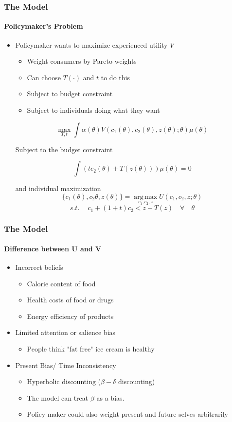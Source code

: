 \documentclass{beamer}
\DeclareMathOperator*{\argmax}{arg\,max}
\begin{document}
\begin{frame}
\frametitle{The Model}
\framesubtitle{Policymaker's Problem}

\begin{itemize}
	\item Policymaker wants to maximize experienced utility $V$
	\begin{itemize}
		\item Weight consumers by Pareto weights 
		\item Can choose $T(\cdot)$ and $t$ to do this
		\item Subject to budget constraint
		\item Subject to individuals doing what they want
		
	\end{itemize}

$$  \max\limits_{T,t} \int \alpha(\theta) V(c_1(\theta), c_2(\theta), z(\theta); \theta)\mu(\theta)
$$

Subject to the budget constraint 

$$ \int (tc_2(\theta) + T(z(\theta)))\mu(\theta) = 0$$

and individual maximization 
$$ \{c_1(\theta),c_2\theta, z(\theta) \} = \argmax \limits_{c_1, c_2, z} U(c_1, c_2, z; \theta) $$
$$ s.t. \quad \ c_1 + (1+t)c_2 < z-T(z)\quad \forall\quad \theta$$
 
	
\end{itemize}
	
\end{frame}


\begin{frame}
\frametitle{The Model}
\framesubtitle{Difference between U and V}

\begin{itemize}
	\item Incorrect beliefs 
	\begin{itemize}
		\item Calorie content of food
		\item Health costs of food or drugs
		\item Energy efficiency of products
	\end{itemize}

	\item Limited attention or salience bias 
		\begin{itemize}
		\item People think "fat free" ice cream is healthy 
		\end{itemize}
	\item Present Bias/ Time Inconsistency
		\begin{itemize}
		\item Hyperbolic discounting ($\beta-\delta$ discounting)
		\item The model can treat $\beta$ as a bias.
		\item Policy maker could also weight present and future selves arbitrarily
		\end{itemize}

\end{itemize}

\end{frame}
\end{document}
